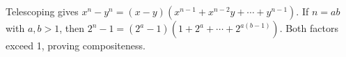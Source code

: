 Telescoping gives $x^n-y^n=(x-y)(x^{n-1}+x^{n-2}y+\cdots+y^{n-1})$. If $n=ab$ with $a,b>1$, then $2^n-1=(2^a-1)(1+2^a+\cdots+2^{a(b-1)})$. Both factors exceed 1, proving compositeness.
